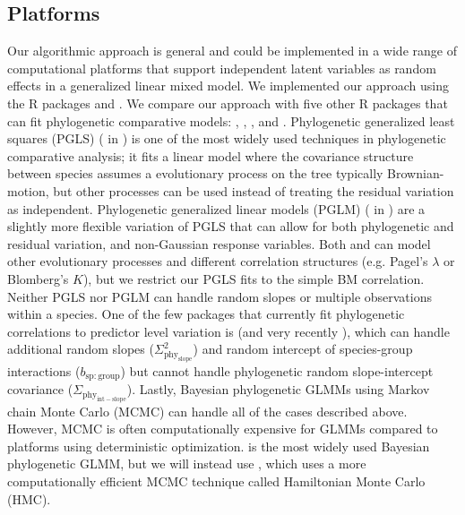 \documentclass[12pt]{article}
\begin{document}
\subsection*{Platforms}

Our algorithmic approach is general and could be implemented in a wide range of computational platforms that support independent latent variables as random effects in a generalized linear mixed model. 
We implemented our approach using the R packages  \citep{bates2015fitting} and  \citep{brooks2017glmmTMB}.
We compare our approach with five other R packages that can fit phylogenetic comparative models:  \citep{pinheiro2014r},  \citep{ho2014phylolm},  \citep{pearse2015pez}, and  \citep{burkner2016brms}.
Phylogenetic generalized least squares (PGLS) ( in ) is one of the most widely used techniques in phylogenetic comparative analysis; it fits a linear model where the covariance structure between species assumes a evolutionary process on the tree typically Brownian-motion, but other processes can be used instead of treating the residual variation as independent.
Phylogenetic generalized linear models (PGLM) ( in ) are a slightly more flexible variation of PGLS that can allow for both phylogenetic and residual variation, and non-Gaussian response variables.
Both  and  can model other evolutionary processes and different correlation structures (e.g. Pagel's $\lambda$ or Blomberg's $K$), but we restrict our PGLS fits to the simple BM correlation. 
Neither PGLS nor PGLM can handle random slopes or multiple observations within a species.
One of the few packages that currently fit phylogenetic correlations to predictor level variation is  (and very recently ), which can handle additional random slopes ($\Sigma^2_{\mathrm{phy_{slope}}}$) and random intercept of species-group interactions ($b_{\mathrm{sp:group}}$) but cannot handle phylogenetic random slope-intercept covariance ($\Sigma_{\mathrm{phy_{int-slope}}}$).
Lastly, Bayesian phylogenetic GLMMs using Markov chain Monte Carlo (MCMC) can handle all of the cases described above. 
However, MCMC is often computationally expensive for GLMMs compared to platforms using deterministic optimization.
 \citep{hadfield2010general} is the most widely used Bayesian phylogenetic GLMM, but we will instead use , which uses a more computationally efficient MCMC technique called Hamiltonian Monte Carlo (HMC)\citep{duane1987hybrid}.
 
\end{document}
